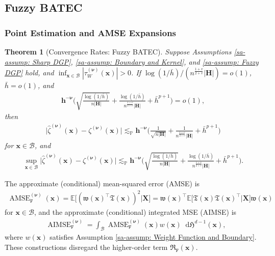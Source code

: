 \documentclass[10pt]{article}
\newtheorem{thm}{Theorem}
\newcommand{\E}{\mathbb{E}}
\newcommand{\Haus}{\mathfrak{H}}
\newcommand{\dif}{\mathop{}\!\mathrm{d}}
\newcommand{\lessp}{\lesssim_{\mathbb{P}}}
\newcommand{\bh}{\mathbf{h}}
\newcommand{\bH}{\mathbf{H}}
\newcommand{\bx}{\mathbf{x}}
\newcommand{\bX}{\mathbf{X}}
\newcommand{\bnu}{\boldsymbol{\nu}}
\newcommand{\B}{\mathcal{B}}
\begin{document}
\subsection{Fuzzy BATEC}

\subsubsection{Point Estimation and AMSE Expansions}

\begin{thm}[Convergence Rates: Fuzzy BATEC]\label{sa-thm: Convergence Rates: Fuzzy BATEC}
    Suppose Assumptions \ref{sa-assump: Sharp DGP}, \ref{sa-assump: Boundary and Kernel}, and \ref{sa-assump: Fuzzy DGP} hold, and $\inf_{\bx\in\B} |\tau^{(\bnu)}_W(\bx)| > 0$. If $\log(1/\bar{h})/(n^{\frac{1+v}{2+v}} |\bH|) = o(1)$, $\bar{h} = o(1)$, and
    \begin{align*}
        \bh^{-\bnu}\bigg(\sqrt{\frac{\log(1/\bar{h})}{n|\bH|}}+\frac{\log(1/\bar{h})}{n^{\frac{1+v}{2+v}}|\bH|}+\bar{h}^{p+1}\bigg)=o(1),
    \end{align*}
    then
    \begin{align*}
        \big| \widehat{\zeta}^{(\bnu)}(\bx) - \zeta^{(\bnu)}(\bx) \big|
        \lessp \bh^{-\bnu} \Big(\frac{1}{\sqrt{n |\bH|}} + \frac{1}{n^{\frac{1+v}{2+v}}|\bH|} + \bar{h}^{p+1}\Big)
    \end{align*}
    for $\bx \in \B$, and
    \begin{align*}
        \sup_{\bx \in \B} \big| \widehat{\zeta}^{(\bnu)}(\bx) - \zeta^{(\bnu)}(\bx) \big|
        \lessp \bh^{-\bnu} \Big(\sqrt{\frac{\log(1/\bar{h})}{ n |\bH|}} + \frac{\log(1/\bar{h})}{n^{\frac{1+v}{2+v}}|\bH|} + \bar{h}^{p+1}\Big).
    \end{align*}
\end{thm}

The approximate (conditional) mean-squared error (AMSE) is
\begin{align*}
    \operatorname{AMSE}_{\mathtt{F}}^{(\bnu)}(\bx)
    = \E \big[(\mathfrak{w}(\bx)^\top \mathfrak{T}(\bx))^2 \big| \bX \big]
    = \mathfrak{w}(\bx)^\top \E \big[\mathfrak{T}(\bx) \mathfrak{T}(\bx)^\top \big| \bX \big] \mathfrak{w}(\bx)
\end{align*}
for $\bx\in \B$, and the approximate (conditional) integrated MSE (AIMSE) is
\begin{align*}
    & \operatorname{AIMSE}_{\mathtt{F}}^{(\bnu)} = \int_{\B}  \operatorname{AMSE}_{\mathtt{F}}^{(\bnu)}(\bx) w(\bx) \dif\Haus^{d-1}(\bx),
\end{align*}
where $w(\bx)$ satisfies Assumption \ref{sa-assump: Weight Function and Boundary}. These constructions disregard the higher-order term $\mathfrak{R}_{\mathtt{F}}(\bx)$.
\end{document}
